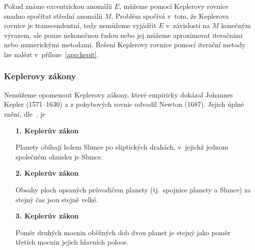 \documentclass[A4paper, 12pt, oneside]{book}
\begin{document}
Pokud známe excentrickou anomálii $E$, můžeme pomocí Keplerovy rovnice snadno spočítat střední anomálii $M$. Problém spočívá v~tom, že Keplerova rovnice je transcendentní, tedy nemůžeme vyjádřit $E$ v~závislosti na $M$ konečným výrazem, ale pouze nekonečnou řadou nebo jej můžeme aproximovat iteračními nebo numerickými metodami. Řešení Keplerovy rovnice pomocí iterační metody lze nalézt v~příloze~\ref{app:kepit}.

\subsubsection{Keplerovy zákony} \label{sec:kepzak}

Nemůžeme opomenout Keplerovy zákony, které empiricky dokázal Johannes Kepler (1571--1630) a z pohybových rovnic odvodil Newton (1687). Jejich úplné znění, dle~\cite{wiki:kepzak}, je 
\begin{enumerate}[wide]
	\item[\textbf{1. Keplerův zákon}] \ 

Planety obíhají kolem Slunce po eliptických drahách, v~jejichž jednom společném ohnisku je Slunce.
	\item[\textbf{2. Keplerův zákon}] \ 

Obsahy ploch opsaných průvodičem planety (tj.\ spojnice planety a Slunce) za stejný čas jsou stejně velké.
	\item[\textbf{3. Keplerův zákon}] \ 

Poměr druhých mocnin oběžných dob dvou planet je stejný jako poměr třetích mocnin jejich hlavních poloos.
\end{enumerate}
\end{document}

